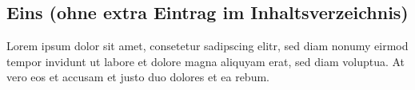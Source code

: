 \chapter{\appendixname}

\section*{Eins (ohne extra Eintrag im Inhaltsverzeichnis)}
Lorem ipsum dolor sit amet, consetetur sadipscing elitr, sed diam nonumy eirmod tempor invidunt ut labore et dolore magna aliquyam erat, sed diam voluptua. At vero eos et accusam et justo duo dolores et ea rebum.

